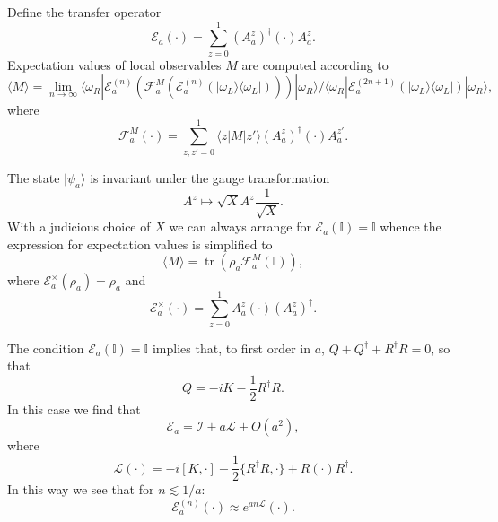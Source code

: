 \documentclass[prl,twocolumn,lengthcheck,superscriptaddress]{revtex4-1}
\newcommand{\tr}{\operatorname{tr}}
\theoremstyle{definition}
\theoremstyle{remark}
\begin{document}
Define the transfer operator
\begin{equation}
	\mathcal{E}_a(\cdot) = \sum_{z=0}^1 (A^z_a)^\dag (\cdot) A^z_a.
\end{equation}
Expectation values of local observables $M$ are computed according to
\begin{equation}
	\langle M \rangle = \lim_{n\rightarrow \infty}\langle \omega_R| \mathcal{E}^{(n)}_a(\mathcal{F}_a^{M}(\mathcal{E}^{(n)}_a(|\omega_L\rangle \langle \omega_L|)))|\omega_R\rangle / \langle \omega_R| \mathcal{E}^{(2n+1)}_a(|\omega_L\rangle \langle \omega_L|)|\omega_R\rangle,
\end{equation}
where
\begin{equation}
	\mathcal{F}_a^{M}(\cdot) = \sum_{z,z'=0}^1 \langle z|M|z'\rangle  (A^z_a)^\dag (\cdot) A^{z'}_a.
\end{equation}

The state $|\psi_a\rangle$ is invariant under the gauge transformation 
\begin{equation}
A^z \mapsto \sqrt{X} A^{z} \frac{1}{\sqrt{X}}.
\end{equation}
With a judicious choice of $X$ we can always arrange for $\mathcal{E}_a(\mathbb{I}) = \mathbb{I}$ whence the expression for expectation values is simplified to
\begin{equation}
	\langle M \rangle = \tr(\rho_a \mathcal{F}_a^{M}(\mathbb{I})),
\end{equation}
where $\mathcal{E}_a^{\times} (\rho_a) = \rho_a$ and 
\begin{equation}
	\mathcal{E}_a^\times(\cdot) = \sum_{z=0}^1 A^z_a (\cdot) (A^z_a)^\dag.
\end{equation}

The condition $\mathcal{E}_a(\mathbb{I}) = \mathbb{I}$ implies that, to first order in $a$, $Q+Q^\dag + R^\dag R = 0$, so that 
\begin{equation}
	Q = -iK -\frac12 R^\dag R.
\end{equation}
In this case we find that 
\begin{equation}
	\mathcal{E}_a = \mathcal{I} + a \mathcal{L} + O(a^2),
\end{equation}
where
\begin{equation}
	\mathcal{L}(\cdot) = -i[K, \cdot] - \frac12\{R^\dag R, \cdot \} + R (\cdot) R^\dag.
\end{equation}
In this way we see that for $n\lesssim 1/a$:
\begin{equation}
	\mathcal{E}_a^{(n)}(\cdot) \approx e^{an \mathcal{L}} (\cdot).
\end{equation}
\end{document}
